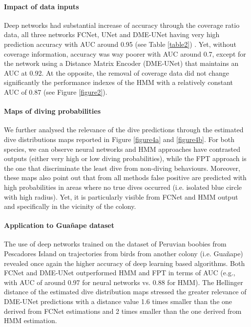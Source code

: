 \documentclass{article}
\begin{document}
\paragraph{Impact of data inputs}
Deep networks had substantial increase of accuracy through the coverage ratio data, all three networks FCNet, UNet and DME-UNet having very high prediction accuracy with AUC around 0.95 (see Table \ref{table2}) .
Yet, without coverage information, accuracy was way poorer with AUC around 0.7, except for the network using a Distance Matrix Encoder (DME-UNet) that maintains an AUC at 0.92.
At the opposite, the removal of coverage data did not change significantly the performance indexes of the HMM with a relatively constant AUC of 0.87 (see Figure \ref{figure2}).

\paragraph{Maps of diving probabilities}
We further analysed the relevance of the dive predictions through the estimated dive distributions maps reported in Figure \ref{figure4a} and \ref{figure4b}. For both species, we can observe neural networks and HMM approaches have contrasted outputs (either very high or low diving probabilities), while the FPT approach is the one that discriminate the least dive from non-diving behaviours. Moreover, these maps also point out that from all methods false positive are predicted with high probabilities in areas where no true dives occurred (i.e. isolated blue circle with high radius). Yet, it is particularly visible from FCNet and HMM output and specifically in the vicinity of the colony.

\paragraph{Application to Gua\~nape dataset}
The use of deep networks trained on the dataset of Peruvian boobies from Pescadores Island on trajectories from birds from another colony (i.e. Gua\~nape) revealed once again the higher accuracy of deep learning based algorithms. Both FCNet and DME-UNet outperformed HMM and FPT in terms of AUC (e.g., with AUC of around 0.97 for neural networks vs. 0.88 for HMM). The Hellinger distance of the estimated dive distribution maps stressed the greater relevance of DME-UNet predictions with a distance value 1.6 times smaller than the one derived from FCNet estimations and 2 times smaller than the one derived from HMM estimation.
\end{document}
